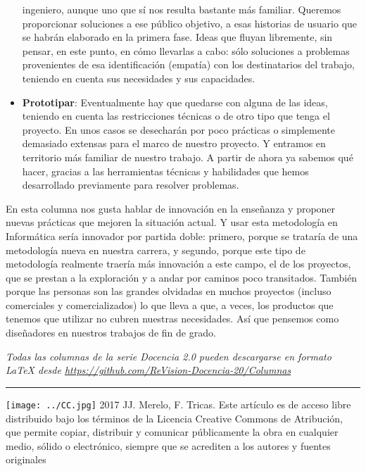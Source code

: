 \documentclass[twoside,10pt]{article}
\newcommand{\surl}[1]{{\small\url{#1}}}
\begin{document}
\begin{multicols}{2}
\begin{itemize}
  ingeniero, aunque uno que sí nos resulta bastante más
  familiar. Queremos proporcionar soluciones a ese público objetivo, a
  esas 
historias de usuario que se habrán elaborado en la primera fase. Ideas que
fluyan libremente, sin pensar, en este punto, en cómo llevarlas a cabo: sólo
soluciones a problemas provenientes de esa identificación (empatía) con los
destinatarios del trabajo, teniendo en cuenta sus necesidades y sus capacidades.
\item {\bf Prototipar}: Eventualmente hay que quedarse con alguna de
  las ideas, teniendo en cuenta las restricciones técnicas o de otro
  tipo que tenga el proyecto. En  unos casos  se desecharán por poco prácticas o simplemente
  demasiado extensas para el marco de nuestro proyecto. Y entramos en
territorio más familiar de nuestro trabajo. A partir de ahora ya sabemos qué
hacer, gracias a las herramientas técnicas y habilidades que hemos
desarrollado previamente para resolver problemas.   
\end{itemize}

En esta columna nos gusta hablar de innovación en la enseñanza y
proponer nuevas prácticas que mejoren la situación actual. Y usar esta
metodología en Informática sería innovador por partida doble: primero, porque
se trataría de una metodología nueva en nuestra carrera, y segundo, porque este
tipo de metodología realmente traería más innovación a este campo, el de los
proyectos, que se prestan a la exploración y a andar por caminos poco
transitados. También porque las personas son las grandes olvidadas en muchos
proyectos (incluso comerciales y comercializados) lo que lleva a que,
a veces, los productos que tenemos que utilizar no cubren nuestras
necesidades. Así que pensemos como diseñadores en nuestros trabajos de
fin de grado. 



\noindent 
\bigskip

\noindent\emph{Todas las columnas de la serie Docencia 2.0
pueden descargarse en formato LaTeX desde
\surl{https://github.com/ReVision-Docencia-20/Columnas}}

\noindent\rule{90mm}{1pt}

{\small \noindent\texttt{[image: ../CC.jpg]} 2017 JJ. Merelo, F. Tricas. Este artículo es de acceso libre distribuido bajo los términos
de la Licencia Creative Commons de Atribución, que permite copiar,
distribuir y comunicar públicamente la obra en cualquier medio, sólido
o electrónico, siempre que se acrediten a los autores y fuentes
originales}

\end{multicols}
\end{document}
